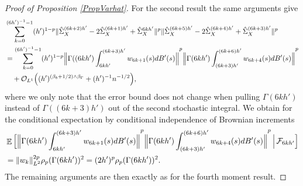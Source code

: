 \documentclass[preprint,aos]{imsart}
\numberwithin{equation}{section}
\theoremstyle{remark}
\DeclareMathOperator{\E}{{\mathbb E}}
\providecommand{\norm}[1]{\lVert #1 \rVert}
\providecommand{\bnorm}[1]{{\Bigl\lVert #1 \Bigr\rVert}}
\begin{document}
\begin{appendix}
\begin{proof}[Proof of Proposition \ref{PropVarhat}]
For the second result the same arguments give
\begin{align*}
&\sum_{k=0}^{(6h')^{-1}-1} (h')^{1-p}\norm{\hat\Sigma_X^{(6k+2)h'}-2\hat\Sigma_X^{(6k+1)h'}+\hat\Sigma_X^{6kh'}}^p \norm{\hat\Sigma_X^{(6k+5)h'}-2\hat\Sigma_X^{(6k+4)h'}+\hat\Sigma_X^{(6k+3)h'}}^p\\
&= \sum_{k=0}^{(6h')^{-1}-1} (h')^{1-p} \bnorm{\Gamma((6kh')\int_{6kh'}^{(6k+3)h'}w_{6k+1}(s)dB'(s)}^p\bnorm{\Gamma(6kh')\int_{(6k+3)h'}^{(6k+6)h'}w_{6k+4}(s)dB'(s)}^p\\
&\quad +{\mathcal O}_{L^1}\Big((h')^{(\beta_b+1/2)\wedge \beta_\Gamma}+(h')^{-1}n^{-1/2}\Big),
\end{align*}
where we only note that the  error bound does not change when pulling $\Gamma(6kh')$ instead of $\Gamma((6k+3)h')$ out of the second stochastic integral.
We  obtain for the conditional expectation by conditional independence of Brownian increments
\begin{align*} &\E\Big[\bnorm{\Gamma(6kh')\int_{6kh'}^{(6k+3)h'}w_{6k+1}(s)dB'(s)}^p\bnorm{\Gamma(6kh')\int_{(6k+3)h'}^{(6k+6)h'}w_{6k+4}(s)dB'(s)}^p\,\Big|\,
{\mathcal F}_{6kh'}\Big]\\
&=\norm{w_k}_{L^2}^{2p}\rho_p(\Gamma(6kh'))^2=(2h')^p\rho_p(\Gamma(6kh'))^2.
\end{align*}
The remaining arguments are then exactly as for the fourth moment result.
\end{proof}


\end{appendix}
\end{document}
